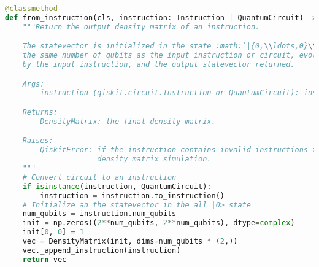 \documentclass{article}
\begin{document}
\begin{lstlisting}[language=Python]
@classmethod
def from_instruction(cls, instruction: Instruction | QuantumCircuit) -> DensityMatrix:
    """Return the output density matrix of an instruction.

    The statevector is initialized in the state :math:`|{0,\\ldots,0}\\rangle` of
    the same number of qubits as the input instruction or circuit, evolved
    by the input instruction, and the output statevector returned.

    Args:
        instruction (qiskit.circuit.Instruction or QuantumCircuit): instruction or circuit

    Returns:
        DensityMatrix: the final density matrix.

    Raises:
        QiskitError: if the instruction contains invalid instructions for
                     density matrix simulation.
    """
    # Convert circuit to an instruction
    if isinstance(instruction, QuantumCircuit):
        instruction = instruction.to_instruction()
    # Initialize an the statevector in the all |0> state
    num_qubits = instruction.num_qubits
    init = np.zeros((2**num_qubits, 2**num_qubits), dtype=complex)
    init[0, 0] = 1
    vec = DensityMatrix(init, dims=num_qubits * (2,))
    vec._append_instruction(instruction)
    return vec
\end{lstlisting}
\end{document}
